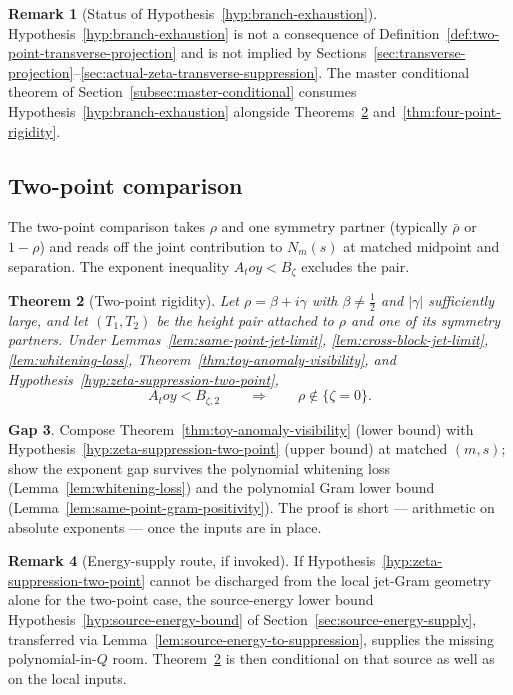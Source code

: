 \documentclass[11pt,a4paper]{amsart}
\def\toy{toy}%
\numberwithin{equation}{section}
\theoremstyle{plain}
\newtheorem{theorem}{Theorem}[section]
\theoremstyle{definition}
\newtheorem{remark}[theorem]{Remark}
\newcommand{\z}{\zeta}
\newcommand{\toy}{\mathrm{toy}}
\newtheorem{wip}[theorem]{Gap}
\begin{document}
\begin{remark}[Status of Hypothesis~\ref{hyp:branch-exhaustion}]
\label{rem:branch-exhaustion-status}
Hypothesis~\ref{hyp:branch-exhaustion} is not a consequence of
Definition~\ref{def:two-point-transverse-projection} and is not implied by
Sections~\ref{sec:transverse-projection}--\ref{sec:actual-zeta-transverse-suppression}.
The master conditional theorem of
Section~\ref{subsec:master-conditional} consumes
Hypothesis~\ref{hyp:branch-exhaustion} alongside
Theorems~\ref{thm:two-point-rigidity}
and~\ref{thm:four-point-rigidity}.
\end{remark}

\subsection{Two-point comparison}
\label{subsec:two-point-comparison}

The two-point comparison takes \(\rho\) and one symmetry partner
(typically \(\bar\rho\) or \(1-\rho\)) and reads off the joint
contribution to \(N_m(s)\) at matched midpoint and separation.  The
exponent inequality \(A_\toy<B_\z\) excludes the pair.

\begin{theorem}[Two-point rigidity]
\label{thm:two-point-rigidity}
Let \(\rho=\beta+i\gamma\) with \(\beta\ne\tfrac12\) and \(|\gamma|\)
sufficiently large, and let \((T_1,T_2)\) be the height pair attached
to \(\rho\) and one of its symmetry partners.  Under
Lemmas~\ref{lem:same-point-jet-limit},
\ref{lem:cross-block-jet-limit}, \ref{lem:whitening-loss},
Theorem~\ref{thm:toy-anomaly-visibility}, and
Hypothesis~\ref{hyp:zeta-suppression-two-point},
\[
A_\toy < B_{\z,2} \qquad\Longrightarrow\qquad \rho\notin\{\zeta=0\}.
\]
\end{theorem}

\begin{wip}\label{rem:wip-two-point-rigidity}
Compose Theorem~\ref{thm:toy-anomaly-visibility} (lower bound) with
Hypothesis~\ref{hyp:zeta-suppression-two-point} (upper bound) at
matched \((m,s)\); show the exponent gap survives the polynomial
whitening loss (Lemma~\ref{lem:whitening-loss}) and the polynomial Gram
lower bound (Lemma~\ref{lem:same-point-gram-positivity}).  The proof is
short --- arithmetic on absolute exponents --- once the inputs are in
place.
\end{wip}

\begin{remark}[Energy-supply route, if invoked]
\label{rem:two-point-energy-supply}
If Hypothesis~\ref{hyp:zeta-suppression-two-point} cannot be discharged
from the local jet-Gram geometry alone for the two-point case, the
source-energy lower bound Hypothesis~\ref{hyp:source-energy-bound} of
Section~\ref{sec:source-energy-supply}, transferred via
Lemma~\ref{lem:source-energy-to-suppression}, supplies the missing
polynomial-in-\(Q\) room.  Theorem~\ref{thm:two-point-rigidity} is then
conditional on that source as well as on the local inputs.
\end{remark}
\end{document}
